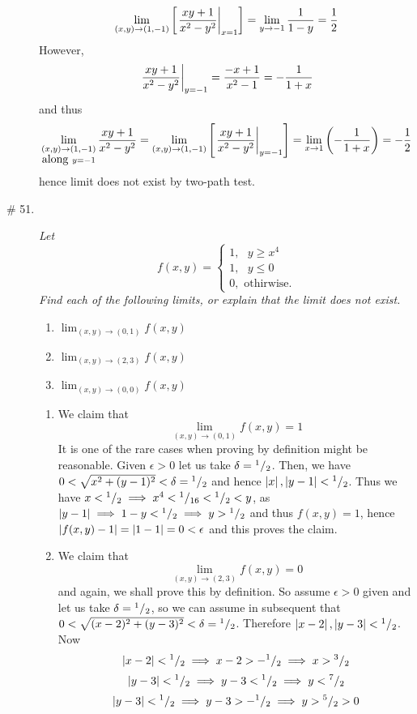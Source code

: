 \documentclass[8pt]{article} %
\begin{document}
\begin{description}
{\[			\lim_{(x,y)\to(1,-1)}\mysbra{\left.\f\right|_{x=1}}=\lim_{y\to-1}\frac{1}{1-y}=\frac{1}{2}\]
			However, \[\left.\frac{xy+1}{x^2-y^2}\right|_{y=-1}=\frac{-x+1}{x^2-1}=-\frac{1}{1+x}\]
		and thus
		\[\lim_{\begin{subarray}{c}(x,y)\to(1,-1)\\\mbox{along }y=-1\end{subarray}}\f=
			\lim_{(x,y)\to(1,-1)}\mysbra{\left.\f\right|_{y=-1}}=\lim_{x\to1}\mybra{-\frac{1}{1+x}}=-\frac{1}{2}\]
		hence limit does not exist by two-path test.
		}
	\item[\# 51.]{{\it Let}
		\[f(x,y)=\begin{cases}1,\mbox{ }y\geq x^4\\1,\mbox{ }y\leq 0\\0,\mbox{ othirwise.}\end{cases}\]
		{\it Find each of the following limits, or explain that the limit does not exist.}
		\begin{enumerate}[label=\bfseries\alph*.]
			\item $\lim_{(x,y)\to(0,1)}f(x,y)$
			\item $\lim_{(x,y)\to(2,3)}f(x,y)$
			\item $\lim_{(x,y)\to(0,0)}f(x,y)$
		\end{enumerate}
		\begin{enumerate}[label=\bfseries\alph*.]
			\item We claim that \[\lim_{(x,y)\to(0,1)}f(x,y)=1\]
				It is one of the rare cases when proving by definition might be reasonable. Given $\epsilon>0$ let
				us take $\delta={^{1}/_{2}}$. Then, we have $0<\sqrt{x^2+(y-1)^2}<\delta={^{1}/_{2}}$ and
				hence $\left|x\right|,\left|y-1\right|<{^{1}/_{2}}$. Thus we have $x<{^{1}/_{2}}\implies
				x^4<{^{1}/_{16}}<{^{1}/_{2}}<y$, as $\left|y-1\right|\implies 1-y<{^{1}/_{2}}\implies y>{^{1}/_{2}}$ and thus $f(x,y)=1$, hence $\left|f(x,y)-1\right|=\left|1-1\right|=0<\epsilon$ and this proves the claim.
			\item We claim that \[\lim_{(x,y)\to(2,3)}f(x,y)=0\]
				and again, we shall prove this by definition. So assume $\epsilon>0$ given and let us take
				$\delta={^{1}/_{2}}$, so we can assume in subsequent that 
				$0<\sqrt{(x-2)^2+(y-3)^2}<\delta={^{1}/_{2}}$. Therefore $\left|x-2\right|,\left|y-3\right|<{^{1}/_{2}}$. Now
				\[\left|x-2\right|<{^{1}/_{2}}\implies x-2>-{^{1}/_{2}}\implies x>{^{3}/_{2}}\]
				\[\left|y-3\right|<{^{1}/_{2}}\implies y-3<{^{1}/_{2}}\implies y<{^{7}/_{2}}\]
				\[\left|y-3\right|<{^{1}/_{2}}\implies y-3>-{^{1}/_{2}}\implies y>{^{5}/_{2}}>0\]

\end{enumerate}}
\end{description}
\end{document}
